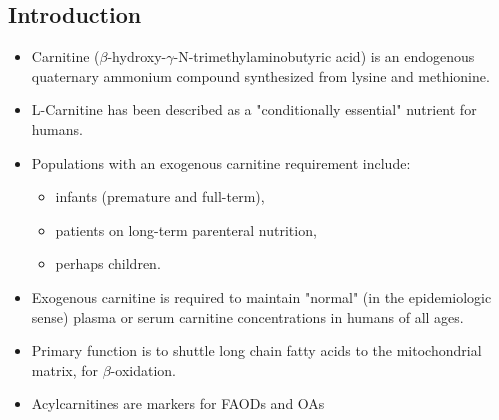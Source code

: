 \documentclass{scrartcl}
\begin{document}
\subsection{Introduction}
\label{sec:org3f2c168}
\begin{itemize}
\item Carnitine (\(\beta\)-hydroxy-\(\gamma\)-N-trimethylaminobutyric acid) is
an endogenous quaternary ammonium compound synthesized from lysine
and methionine.
\item L-Carnitine has been described as a "conditionally essential"
nutrient for humans.
\item Populations with an exogenous carnitine requirement include:
\begin{itemize}
\item infants (premature and full-term),
\item patients on long-term parenteral nutrition,
\item perhaps children.
\end{itemize}
\item Exogenous carnitine is required to maintain "normal" (in the
epidemiologic sense) plasma or serum carnitine concentrations in
humans of all ages.
\item Primary function is to shuttle long chain fatty acids to the
mitochondrial matrix, for \(\beta\)-oxidation.
\item Acylcarnitines are markers for FAODs and OAs
\end{itemize}

\vspace{2em}

\hspace{3em}
\end{document}
